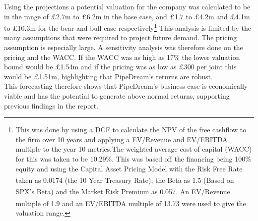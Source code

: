 \documentclass[11pt]{article}		%
\newcommand{\supercite}[1]{\textsuperscript{\cite{#1}}}		%
\begin{document}
    \hspace*{2ex}Using the projections a potential valuation for the company was calculated to be in the range of £2.7m to £6.2m in the base case, and £1.7 to £4.2m and £4.1m to £10.3m for the bear and bull case respectively\footnote{This was done by using a DCF to calculate the NPV of the free cashflow to the firm over 10 years and applying a EV/Revenue and EV/EBITDA multiple to the year 10 metrics.The weighted average cost of capital (WACC) for this was taken to be 10.29\%. This was based off the financing being 100\% equity and using the Capital Asset Pricing Model with the Risk Free Rate taken as 0.0174 (the 10 Year Treasury Rate)\supercite{Treasury}, the Beta as 1.5 (Based on SPX’s Beta)\supercite{SPX_Beta} and the Market Risk Premium as 0.057\supercite{Risk_Premium}. An EV/Revenue multiple of 1.9 and an EV/EBITDA multiple of 13.73\supercite{SPX_multiple} were used to give the valuation range.} This analysis is limited by the many assumptions that were required to project future demand. The pricing assumption is especially large. A sensitivity analysis was therefore done on the pricing and the WACC. If the WACC was as high as 17\% the lower valuation bound would be £1.54m and if the pricing was as low as £300 per joint this would be £1.51m, highlighting that PipeDream’s returns are robust.
  \\ 
    \hspace*{2ex}			
    This forecasting therefore shows that PipeDream's business case is economically viable and has the potential to generate above normal returns, supporting previous findings in the report.
		        	        
\end{document}
